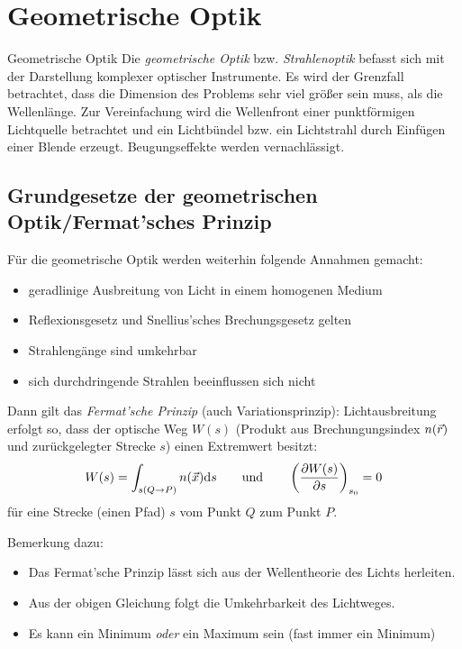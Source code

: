 \chapter{Geometrische Optik}
Geometrische Optik
Die \emph{geometrische Optik}
bzw. \emph{Strahlenoptik} befasst sich mit der
Darstellung komplexer optischer Instrumente.
Es wird der Grenzfall betrachtet, dass die Dimension des Problems sehr
viel größer sein muss, als die Wellenlänge.
Zur Vereinfachung wird die Wellenfront einer punktförmigen Lichtquelle
betrachtet und ein Lichtbündel bzw. ein Lichtstrahl durch Einfügen
einer Blende erzeugt. Beugungseffekte werden vernachlässigt.

\section[Fermat'sches Prinzip]
{Grundgesetze der geometrischen Optik/Fermat'sches Prinzip}
Für die geometrische Optik werden weiterhin folgende Annahmen gemacht:
\begin{itemize}
\item geradlinige Ausbreitung von Licht in einem homogenen Medium
\item Reflexionsgesetz und Snellius'sches Brechungsgesetz gelten
\item Strahlengänge sind umkehrbar
\item sich durchdringende Strahlen beeinflussen sich nicht
\end{itemize}
Dann gilt das \emph{Fermat'sche Prinzip}
(auch Variationsprinzip):
Lichtausbreitung erfolgt so, dass der optische Weg $W(s)$%
(Produkt aus Brechungungsindex $n(\vecr)$ und zurückgelegter Strecke
$s$) einen Extremwert besitzt:
\begin{gather*}
  W(s) = \int_{s(Q\to P)}n(\vecx)\dd s
  \qquad\text{und}\qquad
  \left( \dif[W(s)]{s} \right)_{s_0} = 0
\end{gather*}%
%
für eine Strecke (einen Pfad) $s$ vom Punkt $Q$ zum Punkt $P$.

Bemerkung dazu:
\begin{itemize}
\item Das Fermat'sche Prinzip lässt sich aus der Wellentheorie des
  Lichts herleiten.
\item Aus der obigen Gleichung folgt die Umkehrbarkeit des Lichtweges.
\item Es kann ein Minimum \emph{oder} ein Maximum sein (fast immer ein
  Minimum)
\end{itemize}



